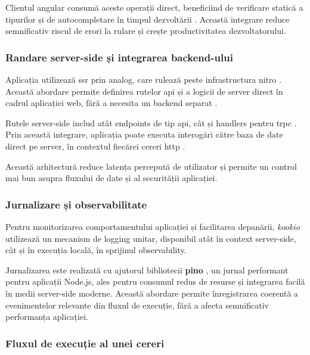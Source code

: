 Clientul \gls{angular} consumă aceste operații direct, beneficiind de verificare statică a tipurilor și de autocompletare în timpul dezvoltării \cite{trpc}.
Această integrare reduce semnificativ riscul de erori la rulare și crește productivitatea dezvoltatorului.

\subsubsection{Randare server-side și integrarea backend-ului}

Aplicația utilizează \acrlong{ssr} prin \gls{analog}, care rulează peste infrastructura \gls{nitro} \cite{analog,nitro}.
Această abordare permite definirea rutelor \acrshort{api} și a logicii de server direct în cadrul aplicației \gls{web}, fără a necesita un \gls{backend} separat \cite{nitro}.

Rutele server-side includ atât \glspl{endpoint} de tip \acrshort{api}, cât și \glspl{handler} pentru \acrshort{trpc} \cite{trpc,nitro}.
Prin această integrare, aplicația poate executa interogări către baza de date direct pe server, în contextul fiecărei cereri \acrshort{http} \cite{prisma}.

Această arhitectură reduce latența percepută de utilizator și permite un control mai bun asupra fluxului de date și al securității aplicației.

\subsubsection{Jurnalizare și observabilitate}

Pentru monitorizarea comportamentului aplicației și facilitarea depanării, \textit{\gls{kookio}} utilizează un mecanism de \gls{logging} unitar, disponibil atât în context server-side, cât și în execuția locală, în sprijinul \gls{observability}.

Jurnalizarea este realizată cu ajutorul bibliotecii \textbf{\gls{pino}} \cite{pino}, un jurnal performant pentru aplicații Node.js, ales pentru consumul redus de resurse și integrarea facilă în medii server-side moderne.
Această abordare permite înregistrarea coerentă a evenimentelor relevante din fluxul de execuție, fără a afecta semnificativ performanța aplicației.

\subsubsection{Fluxul de execuție al unei cereri}\label{subsec:request-flow}

